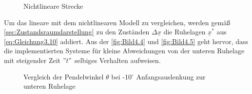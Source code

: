 \begin{figure}[H]
   \centering
   \caption[Nichtlineare Strecke]{Nichtlineare Strecke}
   \label{fig:Bild4.3}
\end{figure}

Um das lineare mit dem nichtlinearen Modell zu vergleichen, werden gemäß \autoref{sec:Zustandsraumdarstellung} zu den Zuständen $\Delta \underline{x}$ die Ruhelagen $\underline{x}^*$ aus \autoref{eq:Gleichung3.10} addiert. Aus der \autoref{fig:Bild4.4} und \autoref{fig:Bild4.5} geht hervor, dass die implementierten Systeme für kleine Abweichungen von der unteren Ruhelage mit steigender Zeit $"t"$ selbiges Verhalten aufweisen.

\begin{figure}[H]
   \centering
   \caption[Vergleich der Pendelwinkel $\theta$ - kleine Auslenkung]{Vergleich der Pendelwinkel $\theta$ bei -10${^\circ}$ Anfangsauslenkung zur unteren Ruhelage}
   \label{fig:Bild4.4}
\end{figure}

